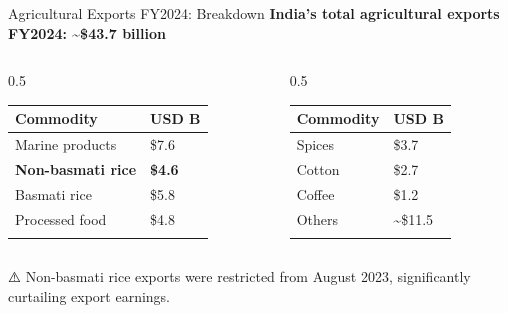 \documentclass[
  ignorenonframetext,
  aspectratio=169,
]{beamer}
\makeatletter
\let\quarto@originallabel\label
\DeclareRobustCommand*{\label}[1]{\quarto@originallabel{#1}}
\makeatother
\begin{document}
\begin{frame}{Agricultural Exports FY2024: Breakdown}
\label{agricultural-exports-fy2024-breakdown}
\textbf{India's total agricultural exports FY2024: \textasciitilde\$43.7
billion}

\begin{columns}[T]
\begin{column}{0.5\linewidth}
\begin{longtable}[]{@{}ll@{}}
\toprule\noalign{}
Commodity & USD B \\
\midrule\noalign{}
\endhead
Marine products & \$7.6 \\
\textbf{Non-basmati rice} & \textbf{\$4.6} \\
Basmati rice & \$5.8 \\
Processed food & \$4.8 \\
\bottomrule\noalign{}
\end{longtable}
\end{column}

\begin{column}{0.5\linewidth}
\begin{longtable}[]{@{}ll@{}}
\toprule\noalign{}
Commodity & USD B \\
\midrule\noalign{}
\endhead
Spices & \$3.7 \\
Cotton & \$2.7 \\
Coffee & \$1.2 \\
Others & \textasciitilde\$11.5 \\
\bottomrule\noalign{}
\end{longtable}
\end{column}
\end{columns}

⚠️ Non-basmati rice exports were restricted from August 2023,
significantly curtailing export earnings.
\end{frame}
\end{document}
